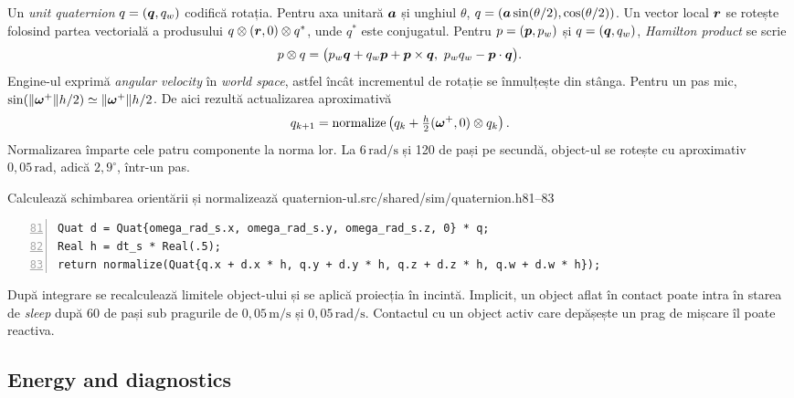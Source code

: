 \documentclass[11pt,a4paper]{article}
\begin{document}
Un \emph{unit quaternion} \(q=(\boldsymbol{q},q_w)\) codifică rotația. Pentru
axa unitară \(\boldsymbol{a}\) și unghiul \(\theta\),
\(q=(\boldsymbol{a}\sin(\theta/2),\cos(\theta/2))\). Un vector local
\(\boldsymbol{r}\) se rotește folosind partea vectorială a produsului
\(q\otimes(\boldsymbol{r},0)\otimes q^\ast\), unde \(q^\ast\) este
conjugatul. Pentru \(p=(\boldsymbol{p},p_w)\) și
\(q=(\boldsymbol{q},q_w)\), \emph{Hamilton product} se scrie
\begin{equation}
 p\otimes q=
 \bigl(p_w\vect q+q_w\vect p+\vect p\times\vect q,\ 
        p_wq_w-\vect p\cdot\vect q\bigr).
\end{equation}
Engine-ul exprimă \emph{angular velocity} în \emph{world space}, astfel încât
incrementul de rotație se înmulțește din stânga. Pentru un pas mic,
\(\sin(\|\boldsymbol{\omega}^+\|h/2)\simeq \|\boldsymbol{\omega}^+\|h/2\).
De aici rezultă actualizarea aproximativă
\begin{equation}
 q_{k+1}=\operatorname{normalize}
 \left(q_k+\tfrac h2(\boldsymbol{\omega}^+,0)\otimes q_k\right).
\end{equation}
Normalizarea împarte cele patru componente la norma lor. La
\(6\,\mathrm{rad/s}\) și 120 de pași pe secundă, object-ul se rotește
cu aproximativ \(0{,}05\,\mathrm{rad}\), adică \(2{,}9^\circ\), într-un pas.
\begin{codefragment}{Calculează schimbarea orientării și normalizează quaternion-ul.}{src/shared/sim/quaternion.h}{81--83}
\begin{lstlisting}[numbers=left,firstnumber=81]
Quat d = Quat{omega_rad_s.x, omega_rad_s.y, omega_rad_s.z, 0} * q;
Real h = dt_s * Real(.5);
return normalize(Quat{q.x + d.x * h, q.y + d.y * h, q.z + d.z * h, q.w + d.w * h});
\end{lstlisting}
\end{codefragment}

După integrare se recalculează limitele object-ului și se aplică
proiecția în incintă. Implicit, un object aflat în contact poate intra
în starea de \emph{sleep} după 60 de pași sub pragurile de \(0{,}05\,\mathrm{m/s}\)
și \(0{,}05\,\mathrm{rad/s}\). Contactul cu un object activ care
depășește un prag de mișcare îl poate reactiva.

\subsection{Energy and diagnostics}
\end{document}
